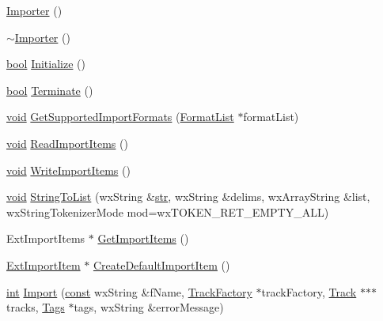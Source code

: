 \begin{DoxyCompactItemize}
\item 
\hyperlink{class_importer_afaf93b56e3558a92405ab627ab8ee1d1}{Importer} ()
\item 
\hyperlink{class_importer_a6e61faae5020f2dc034ff3ea4032a537}{$\sim$\+Importer} ()
\item 
\hyperlink{mac_2config_2i386_2lib-src_2libsoxr_2soxr-config_8h_abb452686968e48b67397da5f97445f5b}{bool} \hyperlink{class_importer_a4e0a11e0b6682371b36c8c68e275cd3f}{Initialize} ()
\item 
\hyperlink{mac_2config_2i386_2lib-src_2libsoxr_2soxr-config_8h_abb452686968e48b67397da5f97445f5b}{bool} \hyperlink{class_importer_a9d6dc153aab7c8fc1f213b318d443a44}{Terminate} ()
\item 
\hyperlink{sound_8c_ae35f5844602719cf66324f4de2a658b3}{void} \hyperlink{class_importer_ae0261a30962ae08e339841aa298dc4b7}{Get\+Supported\+Import\+Formats} (\hyperlink{_import_8h_a9595e9ab21ee91497995586e444c5ccf}{Format\+List} $\ast$format\+List)
\item 
\hyperlink{sound_8c_ae35f5844602719cf66324f4de2a658b3}{void} \hyperlink{class_importer_adc8ce13070002e150ba032d088460d0e}{Read\+Import\+Items} ()
\item 
\hyperlink{sound_8c_ae35f5844602719cf66324f4de2a658b3}{void} \hyperlink{class_importer_a4f095ea8af5d3d8af0d4e6ca31c0e010}{Write\+Import\+Items} ()
\item 
\hyperlink{sound_8c_ae35f5844602719cf66324f4de2a658b3}{void} \hyperlink{class_importer_a3d0844b27039a309a95d16c358a323bd}{String\+To\+List} (wx\+String \&\hyperlink{sndfile__save_8m_a4b99ff73a8a869319570237b5c57ab03}{str}, wx\+String \&delims, wx\+Array\+String \&list, wx\+String\+Tokenizer\+Mode mod=wx\+T\+O\+K\+E\+N\+\_\+\+R\+E\+T\+\_\+\+E\+M\+P\+T\+Y\+\_\+\+A\+LL)
\item 
Ext\+Import\+Items $\ast$ \hyperlink{class_importer_a251340576bf5ef4d5e4030e6e3f51621}{Get\+Import\+Items} ()
\item 
\hyperlink{class_ext_import_item}{Ext\+Import\+Item} $\ast$ \hyperlink{class_importer_a5a7306789703872ca2014f5e936c776c}{Create\+Default\+Import\+Item} ()
\item 
\hyperlink{xmltok_8h_a5a0d4a5641ce434f1d23533f2b2e6653}{int} \hyperlink{class_importer_ab5eae197f7b7617c5ae9aac63b987466}{Import} (\hyperlink{getopt1_8c_a2c212835823e3c54a8ab6d95c652660e}{const} wx\+String \&f\+Name, \hyperlink{class_track_factory}{Track\+Factory} $\ast$track\+Factory, \hyperlink{class_track}{Track} $\ast$$\ast$$\ast$tracks, \hyperlink{class_tags}{Tags} $\ast$tags, wx\+String \&error\+Message)
\end{DoxyCompactItemize}
